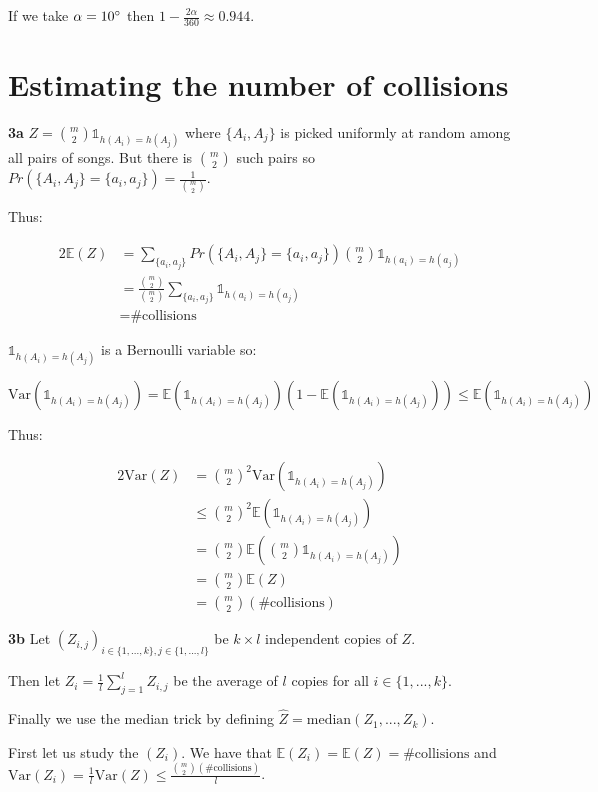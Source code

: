 \documentclass[10pt,a4paper]{article}
\theoremstyle{plain}
\begin{document}
If we take $\alpha = 10\degree$ then $1 - \frac{2\alpha}{360} \approx 0.944$.

\section{Estimating the number of collisions}

\textbf{3a} $Z = {m \choose 2}\mathds{1}_{h(A_i) = h(A_j)}$ where $\{A_i, A_j\}$ is picked uniformly at random among all pairs of songs. But there is ${m \choose 2}$ such pairs so $Pr(\{A_i, A_j\} = \{a_i, a_j\}) = \frac{1}{{m \choose 2}}$.

Thus:

\begin{alignat*}{2}
\mathbb{E}(Z) & = \sum_{\{a_i, a_j\}}{Pr(\{A_i, A_j\} = \{a_i, a_j\}){m \choose 2}\mathds{1}_{h(a_i) = h(a_j)}} \\
& = \frac{{m \choose 2}}{{m \choose 2}}\sum_{\{a_i, a_j\}}{\mathds{1}_{h(a_i) = h(a_j)}} \\
& = \text{\# collisions}
\end{alignat*}

$\mathds{1}_{h(A_i) = h(A_j)}$ is a Bernoulli variable so:

$$
\text{Var}(\mathds{1}_{h(A_i) = h(A_j)}) = \mathbb{E}(\mathds{1}_{h(A_i) = h(A_j)})(1-\mathbb{E}(\mathds{1}_{h(A_i) = h(A_j)})) \leq \mathbb{E}(\mathds{1}_{h(A_i) = h(A_j)})
$$

Thus:

\begin{alignat*}{2}
\text{Var}(Z) & = {m \choose 2}^2 \text{Var}(\mathds{1}_{h(A_i) = h(A_j)}) \\
& \leq {m \choose 2}^2 \mathbb{E}(\mathds{1}_{h(A_i) = h(A_j)}) \\
& = {m \choose 2} \mathbb{E}({m \choose 2}\mathds{1}_{h(A_i) = h(A_j)}) \\
& = {m \choose 2} \mathbb{E}(Z) \\
& = {m \choose 2} (\text{\# collisions})
\end{alignat*}

\textbf{3b} Let $(Z_{i,j})_{i \in \{1, ..., k\}, j \in \{1, ..., l\}}$ be $k \times l$ independent copies of $Z$.

Then let $Z_i = \frac{1}{l}\sum_{j=1}^l{Z_{i,j}}$ be the average of $l$ copies for all $i \in \{1, ..., k\}$.

Finally we use the median trick by defining $\hat{Z} = \text{median}(Z_1, ..., Z_k)$.

First let us study the $(Z_i)$. We have that $\mathbb{E}(Z_i) = \mathbb{E}(Z) = \text{\# collisions}$ and $\text{Var}(Z_i) = \frac{1}{l}\text{Var}(Z) \leq \frac{{m \choose 2} (\text{\# collisions})}{l}$.
\end{document}
